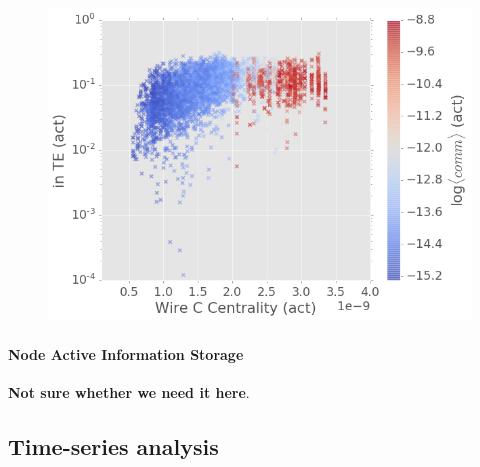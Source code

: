 \documentclass[%
 reprint,
 amsmath,amssymb,
 aps,
]{revtex4-2}
\begin{document}
\begin{figure}[h]
	\centering
	\includegraphics[width=1\linewidth]{figure/TE_cent_act}
	\caption{}
	\label{fig:TE_cent_act}
\end{figure}


\paragraph{Node Active Information Storage}
\textbf{Not sure whether we need it here}.

\subsection{Time-series analysis}
\end{document}
